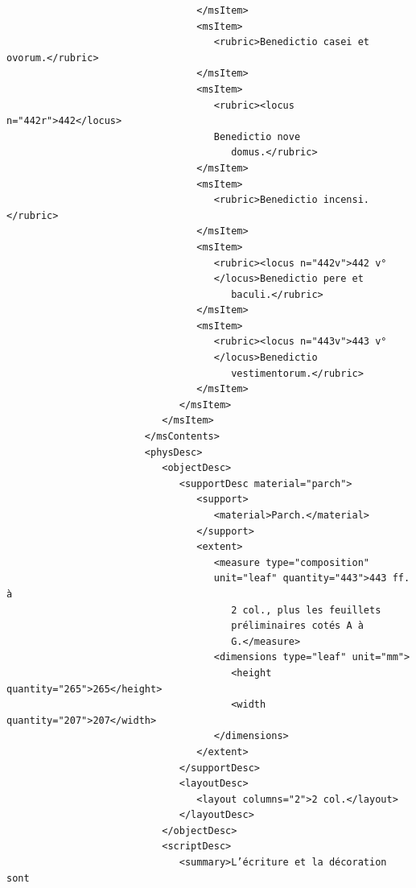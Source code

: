 \documentclass[a4paper,12pt,twoside]{book}
\begin{document}
\begin{verbatim}
                                 </msItem>
                                 <msItem>
                                    <rubric>Benedictio casei et ovorum.</rubric>
                                 </msItem>
                                 <msItem>
                                    <rubric><locus n="442r">442</locus>
                                    Benedictio nove
                                       domus.</rubric>
                                 </msItem>
                                 <msItem>
                                    <rubric>Benedictio incensi.</rubric>
                                 </msItem>
                                 <msItem>
                                    <rubric><locus n="442v">442 v°
                                    </locus>Benedictio pere et
                                       baculi.</rubric>
                                 </msItem>
                                 <msItem>
                                    <rubric><locus n="443v">443 v°
                                    </locus>Benedictio
                                       vestimentorum.</rubric>
                                 </msItem>
                              </msItem>
                           </msItem>
                        </msContents>
                        <physDesc>
                           <objectDesc>
                              <supportDesc material="parch">
                                 <support>
                                    <material>Parch.</material>
                                 </support>
                                 <extent>
                                    <measure type="composition" 
                                    unit="leaf" quantity="443">443 ff. à
                                       2 col., plus les feuillets 
                                       préliminaires cotés A à
                                       G.</measure>
                                    <dimensions type="leaf" unit="mm">
                                       <height quantity="265">265</height>
                                       <width quantity="207">207</width>
                                    </dimensions>
                                 </extent>
                              </supportDesc>
                              <layoutDesc>
                                 <layout columns="2">2 col.</layout>
                              </layoutDesc>
                           </objectDesc>
                           <scriptDesc>
                              <summary>L’écriture et la décoration sont

\end{verbatim}
\end{document}
